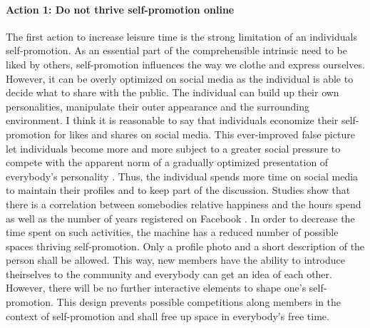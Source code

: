 \documentclass[12pt,numbers=noenddot,parskip,bibliography=totocnumbered,listof=totocnumbered,draft=true]{scrreprt}
\begin{document}
\paragraph{Action 1: Do not thrive self-promotion online}
The first action to increase leisure time is the strong limitation of an individuals self-promotion. As an essential part of the comprehensible intrinsic need to be liked by others, self-promotion influences the way we clothe and express ourselves. However, it can be overly optimized on social media as the individual is able to decide what to share with the public. The individual can build up their own personalities, manipulate their outer appearance and the surrounding environment. I think it is reasonable to say that individuals economize their self-promotion for likes and shares on social media. This ever-improved false picture let individuals become more and more subject to a greater social pressure to compete with the apparent norm of a gradually optimized presentation of everybody's personality \citep{jay2012}. Thus, the individual spends more time on social media to maintain their profiles and to keep part of the discussion. Studies show that there is a correlation between somebodies relative happiness and the hours spend as well as the number of years registered on Facebook \citep[p.119]{chou2012}.\newline
In order to decrease the time spent on such activities, the machine has a reduced number of possible spaces thriving self-promotion. Only a profile photo and a short description of the person shall be allowed. This way, new members have the ability to introduce theirselves to the community and everybody can get an idea of each other. However, there will be no further interactive elements to shape one's self-promotion. This design prevents possible competitions along members in the context of self-promotion and shall free up space in everybody's free time.
\end{document}
